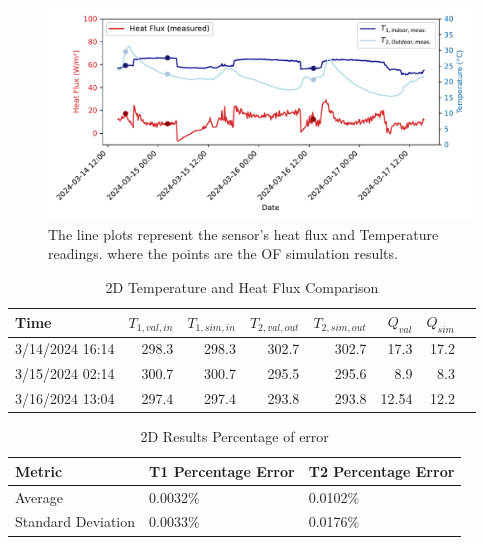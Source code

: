 \begin{figure}[htb]
     \centering
    \includegraphics[width=1\linewidth]{Figures/Validation}
     \caption[2D Experimental Report Plot]{The line plots represent the sensor's heat flux and Temperature readings. where the points are the OF simulation results.}
   \label{fig:expr}
 \end{figure}


\begin{table}[tbh]
    \caption{2D Temperature and Heat Flux Comparison}
    \label{table2d}
    \centering
    \begin{tabular}{lrrrrrrr}
        \toprule
        Time                & $T_{1,val,in}$ & $T_{1,sim,in}$ & $T_{2,val,out}$& $T_{2,sim,out}$ & $Q_{val}$ & $Q_{sim}$ \\
        \midrule
        3/14/2024 16:14 & 298.3    & 298.3    & 302.7     & 302.7     & 17.3 & 17.2 \\
        3/15/2024 02:14  & 300.7    & 300.7   & 295.5    & 295.6     & 8.9  & 8.3  \\
        3/16/2024 13:04 & 297.4  & 297.4   & 293.8   & 293.8   & 12.54 & 12.2  \\
        \bottomrule
    \end{tabular}
   
\end{table}

\begin{table}[]
 \caption{2D Results Percentage of error}
    \label{error2d}
     \centering
 \begin{tabular}{l l l}
        \toprule
        Metric & T1 Percentage Error & T2 Percentage Error \\
        \midrule
        Average & 0.0032\% & 0.0102\% \\
        Standard Deviation & 0.0033\% & 0.0176\% \\
        \bottomrule
    \end{tabular}
\end{table}


